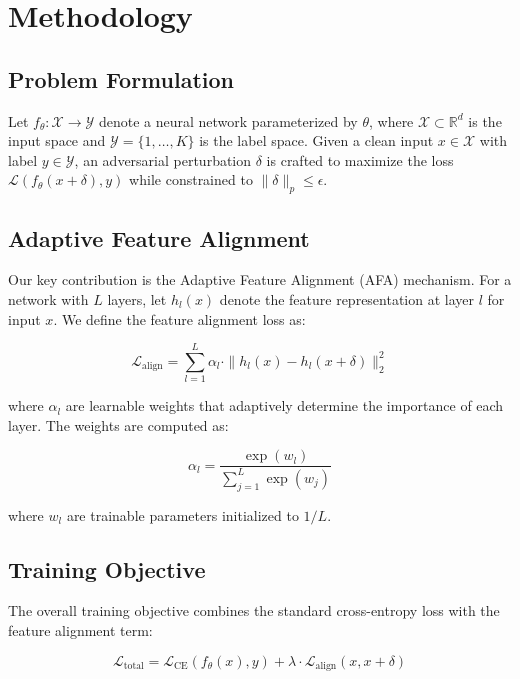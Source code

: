 \section{Methodology}
\label{sec:methodology}

\subsection{Problem Formulation}
Let $f_{\theta}: \mathcal{X} \rightarrow \mathcal{Y}$ denote a neural network parameterized by $\theta$, where $\mathcal{X} \subset \mathbb{R}^{d}$ is the input space and $\mathcal{Y} = \{1, \ldots, K\}$ is the label space. Given a clean input $x \in \mathcal{X}$ with label $y \in \mathcal{Y}$, an adversarial perturbation $\delta$ is crafted to maximize the loss $\mathcal{L}(f_{\theta}(x+\delta), y)$ while constrained to $\|\delta\|_{p} \leq \epsilon$.

\subsection{Adaptive Feature Alignment}
Our key contribution is the Adaptive Feature Alignment (AFA) mechanism. For a network with $L$ layers, let $h_{l}(x)$ denote the feature representation at layer $l$ for input $x$. We define the feature alignment loss as:

\begin{equation}
\mathcal{L}_{\text{align}} = \sum_{l=1}^{L} \alpha_{l} \cdot \|h_{l}(x) - h_{l}(x+\delta)\|_{2}^{2}
\end{equation}

where $\alpha_{l}$ are learnable weights that adaptively determine the importance of each layer. The weights are computed as:

\begin{equation}
\alpha_{l} = \frac{\exp(w_{l})}{\sum_{j=1}^{L} \exp(w_{j})}
\end{equation}

where $w_{l}$ are trainable parameters initialized to $1/L$.

\subsection{Training Objective}
The overall training objective combines the standard cross-entropy loss with the feature alignment term:

\begin{equation}
\mathcal{L}_{\text{total}} = \mathcal{L}_{\text{CE}}(f_{\theta}(x), y) + \lambda \cdot \mathcal{L}_{\text{align}}(x, x+\delta)
\end{equation}

